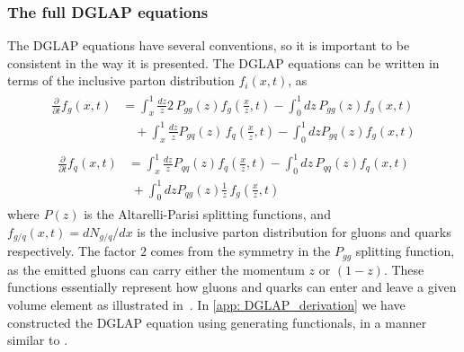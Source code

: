 \documentclass[main.tex]{subfiles}
\begin{document}
\subsubsection*{The full DGLAP equations}
The DGLAP equations have several conventions, so it is important to be consistent in the way it is presented. The DGLAP equations can be written in terms of the inclusive parton distribution \(f_i(x,t)\), as
\begin{align}
    \begin{split}
    \frac{\partial}{\partial t} f_g(x,t) &= \int_x^1 \frac{dz}{z} 2\,P_{gg}(z) f_g\left(\frac{x}{z},t\right) - \int_0^1 dz\, P_{gg}(z) f_g(x,t) \\
    &\quad + \int_x^1 \frac{dz}{z} P_{gq}(z) \, f_q\left(\frac{x}{z},t\right) - \int_0^1 dz P_{gq}(z) f_g(x,t)
    \end{split}\label{eqn: DGLAP_fg(x,t)}
\end{align}
\begin{align}
    \begin{split}
    \frac{\partial}{\partial t} f_q(x,t) &=  \int_x^1 \frac{dz}{z} P_{qq}(z) f_q\left(\frac{x}{z},t\right) - \int_0^1 dz\, P_{qq}(z) f_q(x,t) \\
    &\; + \int_0^1 dz P_{qg}(z) \frac{1}{z}\, f_g\left(\frac{x}{z},t\right)
    \end{split}\label{eqn: DGLAP_fq(x,t)}
\end{align}
where \(P(z)\) is the Altarelli-Parisi splitting functions, and \(f_{g/q}(x,t) = dN_{g/q}/dx\) is the inclusive parton distribution for gluons and quarks respectively. The factor \(2\) comes from the symmetry in the \(P_{gg}\) splitting function, as the emitted gluons can carry either the momentum \(z\) or \((1-z)\). These functions essentially represent how gluons and quarks can enter and leave a given volume element as illustrated in~\cite[p.166-168]{ellis_stirling_webber_1996}. In \autoref{app: DGLAP_derivation} we have constructed the DGLAP equation using generating functionals, in a manner similar to \cite{Probabilistic_picture}.
\end{document}
